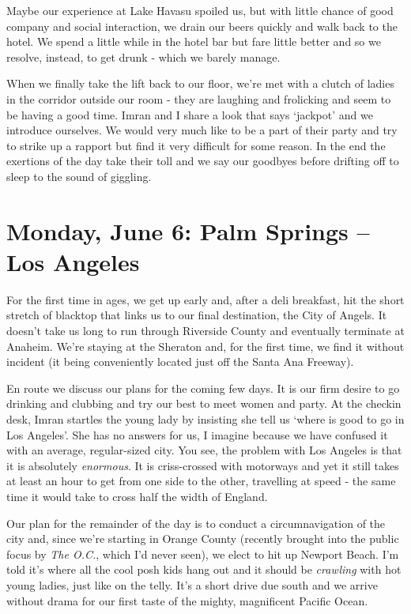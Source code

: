 \documentclass[a5paper,titlepage,11pt,draft]{book}
\begin{document}
Maybe our experience at Lake Havasu spoiled us, but with little chance of good company and social interaction, we drain our beers quickly and walk back to the hotel.  We spend a little while in the hotel bar but fare little better and so we resolve, instead, to get drunk - which we barely manage.

When we finally take the lift back to our floor, we're met with a clutch of ladies in the corridor outside our room - they are laughing and frolicking and seem to be having a good time.  Imran and I share a look that says `jackpot' and we introduce ourselves.  We would very much like to be a part of their party and try to strike up a rapport but find it very difficult for some reason.  In the end the exertions of the day take their toll and we say our goodbyes before drifting off to sleep to the sound of giggling.

\chapter[Palm Springs -- Los Angeles]{Monday, June 6:  Palm Springs -- Los Angeles}
For the first time in ages, we get up early and, after a deli breakfast, hit the short stretch of blacktop that links us to our final destination, the City of Angels.  It doesn't take us long to run through Riverside County and eventually terminate at Anaheim.  We're staying at the Sheraton and, for the first time, we find it without incident (it being conveniently located just off the Santa Ana Freeway).

En route we discuss our plans for the coming few days.  It is our firm desire to go drinking and clubbing and try our best to meet women and party.  At the checkin desk, Imran startles the young lady by insisting she tell us `where is good to go in Los Angeles'.  She has no answers for us, I imagine because we have confused it with an average, regular-sized city.  You see, the problem with Los Angeles is that it is absolutely \emph{enormous}.  It is criss-crossed with motorways and yet it still takes at least an hour to get from one side to the other, travelling at speed - the same time it would take to cross half the width of England.

Our plan for the remainder of the day is to conduct a circumnavigation of the city and, since we're starting in Orange County (recently brought into the public focus by \emph{The O.C.}, which I'd never seen), we elect to hit up Newport Beach.  I'm told it's where all the cool posh kids hang out and it should be \emph{crawling} with hot young ladies, just like on the telly.  It's a short drive due south and we arrive without drama for our first taste of the mighty, magnificent Pacific Ocean.
\end{document}

